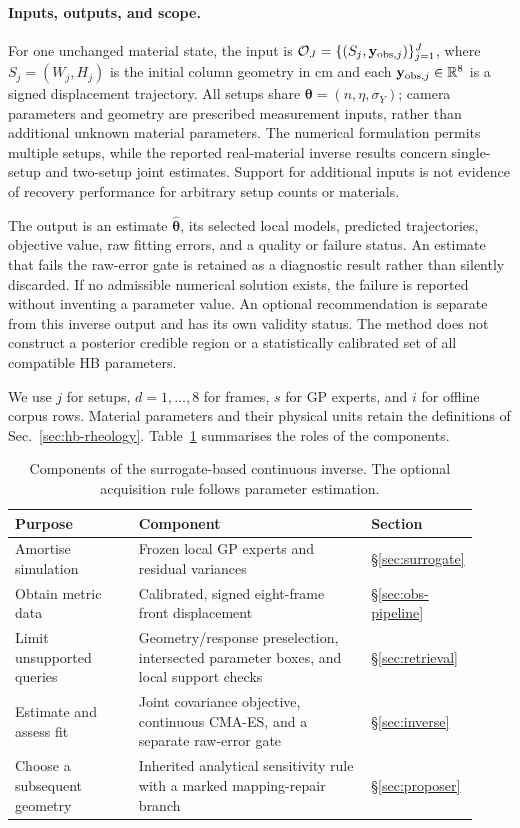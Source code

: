 \paragraph{Inputs, outputs, and scope.}
For one unchanged material state, the input is
$\mathcal O_J=\{(S_j,\mathbf y_{{\rm obs},j})\}_{j=1}^{J}$, where
$S_j=(W_j,H_j)$ is the initial column geometry in cm and each
$\mathbf y_{{\rm obs},j}\in\mathbb R^8$ is a signed displacement
trajectory. All setups share $\boldsymbol\theta=(n,\eta,\sigma_Y)$;
camera parameters and geometry are prescribed measurement inputs,
rather than additional unknown material parameters. The numerical
formulation permits multiple setups, while the reported real-material
inverse results concern single-setup and two-setup joint estimates.
Support for additional inputs is not evidence of recovery performance
for arbitrary setup counts or materials.

The output is an estimate $\hat{\boldsymbol\theta}$, its selected local
models, predicted trajectories, objective value, raw fitting errors,
and a quality or failure status. An estimate that fails the raw-error
gate is retained as a diagnostic result rather than silently discarded.
If no admissible numerical solution exists, the failure is reported
without inventing a parameter value. An optional recommendation is
separate from this inverse output and has its own validity status.
The method does not construct a posterior credible region or a
statistically calibrated set of all compatible HB parameters.

We use $j$ for setups, $d=1,\ldots,8$ for frames, $s$ for GP experts,
and $i$ for offline corpus rows. Material parameters and their physical
units retain the definitions of Sec.~\ref{sec:hb-rheology}.
Table~\ref{tab:subs} summarises the roles of the components.

\begin{table}[!htbp]
\centering\footnotesize
\setlength{\tabcolsep}{4pt}
\caption{Components of the surrogate-based continuous inverse.
The optional acquisition rule follows parameter estimation.}
\label{tab:subs}
\begin{tabular}{@{}p{0.27\linewidth}p{0.51\linewidth}p{0.14\linewidth}@{}}
\toprule
Purpose & Component & Section \\
\midrule
Amortise simulation & Frozen local GP experts and residual variances
 & \S\ref{sec:surrogate} \\
Obtain metric data & Calibrated, signed eight-frame front displacement
 & \S\ref{sec:obs-pipeline} \\
Limit unsupported queries & Geometry/response preselection, intersected
parameter boxes, and local support checks & \S\ref{sec:retrieval} \\
Estimate and assess fit & Joint covariance objective, continuous CMA-ES,
and a separate raw-error gate & \S\ref{sec:inverse} \\
Choose a subsequent geometry & Inherited analytical sensitivity rule
with a marked mapping-repair branch & \S\ref{sec:proposer} \\
\bottomrule
\end{tabular}
\end{table}

